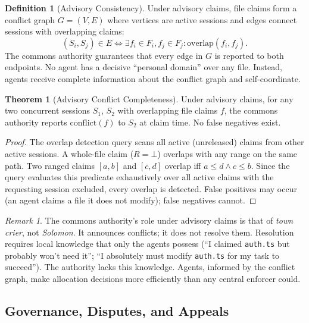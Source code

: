 \documentclass[11pt,a4paper]{article}
\theoremstyle{definition}
\newtheorem{definition}{Definition}[section]
\newtheorem{theorem}{Theorem}[section]
\theoremstyle{remark}
\newtheorem*{remark}{Remark}
\begin{document}
\begin{definition}[Advisory Consistency]\label{def:advisory}
Under advisory claims, file claims form a conflict graph $G = (V, E)$ where vertices are active sessions and edges connect sessions with overlapping claims:
\[
(S_i, S_j) \in E \iff \exists f_i \in F_i, f_j \in F_j : \text{overlap}(f_i, f_j).
\]
The commons authority guarantees that every edge in $G$ is reported to both endpoints. No agent has a decisive ``personal domain'' over any file. Instead, agents receive complete information about the conflict graph and self-coordinate.
\end{definition}

\begin{theorem}[Advisory Conflict Completeness]\label{thm:advisory}
Under advisory claims, for any two concurrent sessions $S_1$, $S_2$ with overlapping file claims $f$, the commons authority reports $\text{conflict}(f)$ to $S_2$ at claim time. No false negatives exist.
\end{theorem}

\begin{proof}
The overlap detection query scans all active (unreleased) claims from other active sessions. A whole-file claim ($R = \bot$) overlaps with any range on the same path. Two ranged claims $[a,b]$ and $[c,d]$ overlap iff $a \leq d \land c \leq b$. Since the query evaluates this predicate exhaustively over all active claims with the requesting session excluded, every overlap is detected. False positives may occur (an agent claims a file it does not modify); false negatives cannot.
\end{proof}

\begin{remark}
The commons authority's role under advisory claims is that of \emph{town crier}, not \emph{Solomon}. It announces conflicts; it does not resolve them. Resolution requires local knowledge that only the agents possess (``I claimed \texttt{auth.ts} but probably won't need it''; ``I absolutely must modify \texttt{auth.ts} for my task to succeed''). The authority lacks this knowledge. Agents, informed by the conflict graph, make allocation decisions more efficiently than any central enforcer could.
\end{remark}

\subsection{Governance, Disputes, and Appeals}\label{sec:governance}
\end{document}
